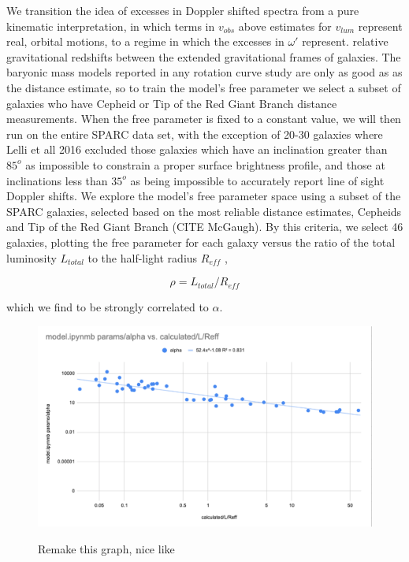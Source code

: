 \documentclass[reprint,%
 amsmath,amssymb,
 aps,
]{revtex4-1}
\begin{document}
We transition the idea of excesses in Doppler shifted spectra from a  pure kinematic interpretation, in which terms in  $v_{obs}$ above estimates for  $v_{lum}$ represent real, orbital motions, to a regime in which the excesses in $\omega'$ represent.
  relative gravitational redshifts between the extended gravitational  frames of  galaxies. 
 The baryonic mass models reported in any rotation curve study are only as good as    as the distance estimate, so to train the model's free parameter we select a subset of galaxies who have Cepheid or Tip of the Red Giant Branch distance measurements.  When the free parameter is fixed to a constant value, we will then run on the entire SPARC data set, with the exception of 20-30 galaxies where Lelli et all 2016 excluded those galaxies which have an inclination greater than $85^o$ as impossible to constrain a proper surface brightness profile, and those at inclinations less than $35^o$ as being impossible to accurately report line of sight Doppler shifts.   
 We   explore the    model's free parameter space using a subset of the SPARC galaxies, selected based on  the most reliable distance estimates,   Cepheids and Tip of the Red Giant Branch (CITE McGaugh).   By this criteria, we select 46 galaxies, plotting the free parameter for each galaxy versus the ratio of the total luminosity $L_{total}$ to    the half-light radius $R_{eff}$ \cite{Lelli_2016surface},  
 
 \begin{equation}
     \rho = L_{total}/R_{eff}
 \end{equation}
 
  which we find to be   strongly correlated to   $\alpha$. 
  
 \begin{figure}[h]
\scalebox{0.5}%
{\includegraphics{alpha_10_18_22.png} }
\caption{ Remake this graph, nice like }
\label{alpha2}
\end{figure}  
 
\end{document}
